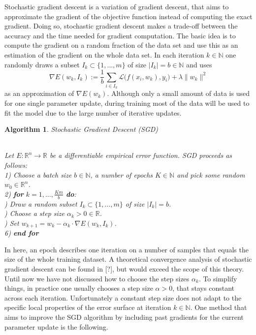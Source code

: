 \documentclass[11pt, a4paper]{article}
\newtheorem{algorithm}[theorem]{Algorithm}
\newcommand{\N}{\mathds{N}}
\newcommand{\R}{\mathds{R}}
\renewcommand{\L}{\mathcal{L}}
\begin{document}
Stochastic gradient descent is a variation of gradient descent, that aims to approximate the gradient of the objective function instead of computing the exact gradient. Doing so, stochastic gradient descent makes a trade-off between the accuracy and the time needed for gradient computation. The basic idea is to compute the gradient on a random fraction of the data set and use this as an estimation of the gradient on the whole data set. In each iteration $k \in \N$ one randomly draws a subset $I_k \subset \{ 1, \dots, m \}$ of size $| I_k | = b \in \N$ and uses
\[ \nabla E(w_k,I_k) := \frac{1}{b} \sum_{i \in I_k}^{}  \L \big ( f(x_i,w_k),y_i \big) + \lambda \| w_k \|^2 \]
as an approximation of $\nabla E(w_k)$. Although only a small amount of data is used for one single parameter update, during training most of the data will be used to fit the model due to the large number of iterative updates.
\pagebreak

\begin{algorithm}
\caption{Stochastic Gradient Descent (SGD)} \ \\
Let $E: \R^n \to \R$ be a differentiable empirical error function. SGD proceeds as follows: \\

1) Choose a batch size $b \in \N$, a number of epochs $K \in \N$ and pick some random $w_0 \in \R^n$. \\

2) \textbf{for} $k=1, \dots, \frac{Km}{b}$ \textbf{do}: \\

) Draw a random subset $I_k \subset \{1, \dots, m \}$ of size $| I_k | = b$. \\

) Choose a step size $\alpha_k > 0 \in \R$. \\

) Set $w_{k+1} = w_k - \alpha_k \cdot \nabla E(w_k,I_k)$. \\

6) \textbf{end for} \\
\end{algorithm}

In here, an epoch describes one iteration on a number of samples that equals the size of the whole training dataset. A theoretical convergence analysis of stochastic gradient descent can be found in [?], but would exceed the scope of this theory. \\

Until now we have not discussed how to choose the step sizes $\alpha_k$. To simplify things, in practice one usually chooses a step size $\alpha > 0$, that stays constant across each iteration. Unfortunately a constant step size does not adapt to the specific local properties of the error surface at iteration $k \in \N$. One method that aims to improve the SGD algorithm by including past gradients for the current parameter update is the following.
\end{document}
